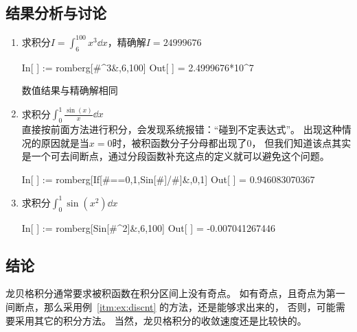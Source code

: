 \documentclass{hitgsrep}
\begin{document}
\subsection{结果分析与讨论}

\begin{enumerate}
    \item 求积分$I=\int_6^{100}x^3\dd{x}$，精确解$I=24999676$
    \begin{wlinput}
    In[ ] := romberg[#^3&,{6,100}]
    Out[ ] = 2.4999676*10^7
    \end{wlinput}
    数值结果与精确解相同
    \item\label{itm:ex:discnt} 求积分$\int_0^1\frac{\sin(x)}{x}\dd{x}$\\
    直接按前面方法进行积分，会发现系统报错：“碰到不定表达式”。
    出现这种情况的原因就是当$x=0$时，被积函数分子分母都出现了$0$，
    但我们知道该点其实是一个可去间断点，通过分段函数补充这点的定义就可以避免这个问题。
    \begin{wlinput}
    In[ ] := romberg[If[#==0,1,Sin[#]/#]&,{0,1}]
    Out[ ] = 0.946083070367
    \end{wlinput}
    \item 求积分$\int_0^1\sin(x^2)\dd{x}$
    \begin{wlinput}
    In[ ] := romberg[Sin[#^2]&,{6,100}]
    Out[ ] = -0.007041267446
    \end{wlinput}
\end{enumerate}

\subsection{结论}

龙贝格积分通常要求被积函数在积分区间上没有奇点。
如有奇点，且奇点为第一间断点，那么采用例~\ref{itm:ex:discnt} 的方法，还是能够求出来的，
否则，可能需要采用其它的积分方法。
当然，龙贝格积分的收敛速度还是比较快的。
\end{document}
